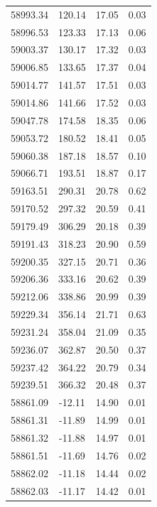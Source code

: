 \begin{longtable}{|c|c|c|c|}
 58993.34 &  120.14 &       17.05 &          0.03 \\
 58996.53 &  123.33 &       17.13 &          0.06 \\
 59003.37 &  130.17 &       17.32 &          0.03 \\
 59006.85 &  133.65 &       17.37 &          0.04 \\
 59014.77 &  141.57 &       17.51 &          0.03 \\
 59014.86 &  141.66 &       17.52 &          0.03 \\
 59047.78 &  174.58 &       18.35 &          0.06 \\
 59053.72 &  180.52 &       18.41 &          0.05 \\
 59060.38 &  187.18 &       18.57 &          0.10 \\
 59066.71 &  193.51 &       18.87 &          0.17 \\
 59163.51 &  290.31 &       20.78 &          0.62 \\
 59170.52 &  297.32 &       20.59 &          0.41 \\
 59179.49 &  306.29 &       20.18 &          0.39 \\
 59191.43 &  318.23 &       20.90 &          0.59 \\
 59200.35 &  327.15 &       20.71 &          0.36 \\
 59206.36 &  333.16 &       20.62 &          0.39 \\
 59212.06 &  338.86 &       20.99 &          0.39 \\
 59229.34 &  356.14 &       21.71 &          0.63 \\
 59231.24 &  358.04 &       21.09 &          0.35 \\
 59236.07 &  362.87 &       20.50 &          0.37 \\
 59237.42 &  364.22 &       20.79 &          0.34 \\
 59239.51 &  366.32 &       20.48 &          0.37 \\
 58861.09 &  -12.11 &       14.90 &          0.01 \\
 58861.31 &  -11.89 &       14.99 &          0.01 \\
 58861.32 &  -11.88 &       14.97 &          0.01 \\
 58861.51 &  -11.69 &       14.76 &          0.02 \\
 58862.02 &  -11.18 &       14.44 &          0.02 \\
 58862.03 &  -11.17 &       14.42 &          0.01 \\

\end{longtable}

